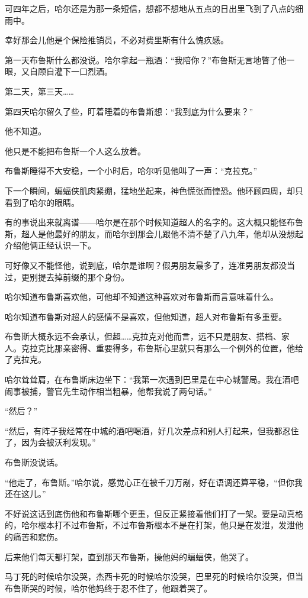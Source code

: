\documentclass[../main]{subfiles}
\begin{document}
可四年之后，哈尔还是为那一条短信，想都不想地从五点的日出里飞到了八点的细雨中。

幸好那会儿他是个保险推销员，不必对费里斯有什么愧疚感。

第一天布鲁斯什么都没说。哈尔拿起一瓶酒：“我陪你？”布鲁斯无言地瞥了他一眼，又自顾自灌下一口烈酒。

第二天，第三天……

第四天哈尔留久了些，盯着睡着的布鲁斯想：“我到底为什么要来？”

他不知道。

他只是不能把布鲁斯一个人这么放着。

布鲁斯睡得不大安稳，一个小时后，哈尔听见他叫了一声：“克拉克。”

下一个瞬间，蝙蝠侠肌肉紧绷，猛地坐起来，神色慌张而惶恐。他环顾四周，却只看到了哈尔的眼睛。

有的事说出来就离谱——哈尔是在那个时候知道超人的名字的。这大概只能怪布鲁斯，超人是他最好的朋友，而哈尔到那会儿跟他不清不楚了八九年，他却从没想起介绍他俩正经认识一下。

可好像又不能怪他，说到底，哈尔是谁啊？假男朋友最多了，连准男朋友都没当过，更别提去掉前缀的那个身份。

哈尔知道布鲁斯喜欢他，可他却不知道这种喜欢对布鲁斯而言意味着什么。

哈尔知道布鲁斯对超人的感情不是喜欢，但他知道，超人对布鲁斯有多重要。

布鲁斯大概永远不会承认，但超……克拉克对他而言，远不只是朋友、搭档、家人。克拉克比那亲密得、重要得多，布鲁斯心里就只有那么一个例外的位置，他给了克拉克。

哈尔耸耸肩，在布鲁斯床边坐下：“我第一次遇到巴里是在中心城警局。我在酒吧闹事被捕，警官先生动作相当粗暴，他帮我说了两句话。”

“然后？”

“然后，有阵子我经常在中城的酒吧喝酒，好几次差点和别人打起来，但我都忍住了，因为会被沃利发现。”

布鲁斯没说话。

“他走了，布鲁斯。”哈尔说，感觉心正在被千刀万剐，好在语调还算平稳，“但你我还在这儿。”

不好说这话到底伤他和布鲁斯哪个更重，但反正紧接着他们打了一架。要是动真格的，哈尔根本打不过布鲁斯，不过布鲁斯根本不是在打架，他只是在发泄，发泄他的痛苦和悲伤。

后来他们每天都打架，直到那天布鲁斯，操他妈的蝙蝠侠，他哭了。

马丁死的时候哈尔没哭，杰西卡死的时候哈尔没哭，巴里死的时候哈尔没哭，但当布鲁斯哭的时候，哈尔他妈终于忍不住了，他跟着哭了。
\end{document}
